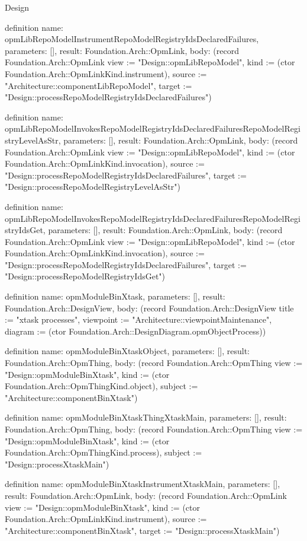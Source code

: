 \begin{lexlean}{Design}
\begin{semanticmodule}
definition{
  name: opmLibRepoModelInstrumentRepoModelRegistryIdsDeclaredFailures,
  parameters: [],
  result: Foundation.Arch::OpmLink,
  body: (record Foundation.Arch::OpmLink {view := "Design::opmLibRepoModel", kind := (ctor Foundation.Arch::OpmLinkKind.instrument), source := "Architecture::componentLibRepoModel", target := "Design::processRepoModelRegistryIdsDeclaredFailures"})
}

definition{
  name: opmLibRepoModelInvokesRepoModelRegistryIdsDeclaredFailuresRepoModelRegistryLevelAsStr,
  parameters: [],
  result: Foundation.Arch::OpmLink,
  body: (record Foundation.Arch::OpmLink {view := "Design::opmLibRepoModel", kind := (ctor Foundation.Arch::OpmLinkKind.invocation), source := "Design::processRepoModelRegistryIdsDeclaredFailures", target := "Design::processRepoModelRegistryLevelAsStr"})
}

definition{
  name: opmLibRepoModelInvokesRepoModelRegistryIdsDeclaredFailuresRepoModelRegistryIdsGet,
  parameters: [],
  result: Foundation.Arch::OpmLink,
  body: (record Foundation.Arch::OpmLink {view := "Design::opmLibRepoModel", kind := (ctor Foundation.Arch::OpmLinkKind.invocation), source := "Design::processRepoModelRegistryIdsDeclaredFailures", target := "Design::processRepoModelRegistryIdsGet"})
}

definition{
  name: opmModuleBinXtask,
  parameters: [],
  result: Foundation.Arch::DesignView,
  body: (record Foundation.Arch::DesignView {title := "xtask processes", viewpoint := "Architecture::viewpointMaintenance", diagram := (ctor Foundation.Arch::DesignDiagram.opmObjectProcess)})
}

definition{
  name: opmModuleBinXtaskObject,
  parameters: [],
  result: Foundation.Arch::OpmThing,
  body: (record Foundation.Arch::OpmThing {view := "Design::opmModuleBinXtask", kind := (ctor Foundation.Arch::OpmThingKind.object), subject := "Architecture::componentBinXtask"})
}

definition{
  name: opmModuleBinXtaskThingXtaskMain,
  parameters: [],
  result: Foundation.Arch::OpmThing,
  body: (record Foundation.Arch::OpmThing {view := "Design::opmModuleBinXtask", kind := (ctor Foundation.Arch::OpmThingKind.process), subject := "Design::processXtaskMain"})
}

definition{
  name: opmModuleBinXtaskInstrumentXtaskMain,
  parameters: [],
  result: Foundation.Arch::OpmLink,
  body: (record Foundation.Arch::OpmLink {view := "Design::opmModuleBinXtask", kind := (ctor Foundation.Arch::OpmLinkKind.instrument), source := "Architecture::componentBinXtask", target := "Design::processXtaskMain"})
}


\end{semanticmodule}
\end{lexlean}
